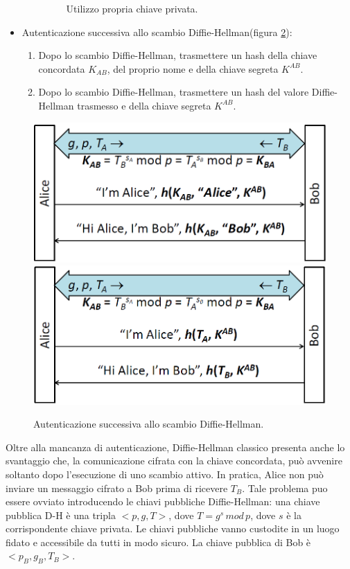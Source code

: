 \begin{itemize}
\begin{enumerate}
\begin{figure}[htbp]
	\caption{Utilizzo propria chiave privata.}
	\label{fig:auth3}
	\end{figure}
\end{enumerate}
\item Autenticazione successiva allo scambio Diffie-Hellman(figura \ref{fig:auth45}):
\begin{enumerate}
\item Dopo lo scambio Diffie-Hellman, trasmettere un hash della chiave concordata $K_{AB}$, del proprio nome e della chiave segreta $K^{AB}$.
\item Dopo lo scambio Diffie-Hellman, trasmettere un hash del valore
Diffie-Hellman trasmesso e della chiave segreta $K^{AB}$.
\end{enumerate}
\end{itemize}
\begin{figure}[htbp]
	\centering
	\subfigure
	{\includegraphics[scale=0.5, keepaspectratio]{Immagini/Capitolo6/DiffieHellman_auth4.png}}
	\hspace{2mm}
	\subfigure
	{\includegraphics[scale=0.5, keepaspectratio]{Immagini/Capitolo6/DiffieHellman_auth5.png}}
	\caption{Autenticazione successiva allo scambio Diffie-Hellman.}
	\label{fig:auth45}
	\end{figure}

Oltre alla mancanza di autenticazione, Diffie-Hellman classico presenta anche lo svantaggio che, la comunicazione cifrata con la chiave concordata, può avvenire soltanto dopo l'esecuzione di uno scambio attivo. In pratica, Alice non può inviare un messaggio cifrato a Bob prima di ricevere $T_{B}$. Tale problema puo essere ovviato
introducendo le chiavi pubbliche Diffie-Hellman: una chiave pubblica D-H è una tripla $<p, g, T>$, dove $T = g^s \, mod \, p$, dove $s$ è la corrispondente chiave privata. Le chiavi pubbliche vanno custodite in un luogo fidato e accessibile da tutti in modo sicuro. La chiave pubblica di Bob è $<p_{B}, g_{B}, T_{B}>$. \\

